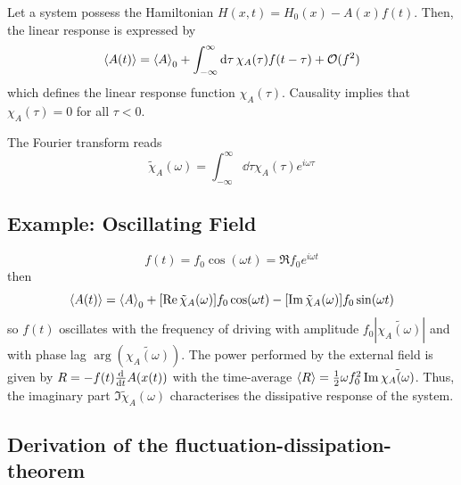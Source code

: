 \documentclass{notebook}
\begin{document}
Let a system possess the Hamiltonian $H(x,t) = H_0(x) - A(x) f(t)$. Then, the linear response is expressed by
%
\begin{equation}
	\expval{A(t)} = \expval{A}_0 + \int_{-\infty}^{\infty} \dd{\tau} \chi_A(\tau) f(t-\tau) + \mathcal{O}(f^2)
\end{equation}
%
which defines the linear response function $\chi_A(\tau)$. Causality implies that $\chi_A(\tau) = 0$ for all $\tau < 0$.

The Fourier transform reads
%
\begin{equation}
\tilde{\chi}_A(\omega) = \int_{-\infty}^{\infty} \dd{\tau} \chi_A(\tau) e^{i \omega \tau}
\end{equation}
%

\subsection*{Example: Oscillating Field}
%
\begin{equation}
	f(t) = f_0 \cos(\omega t) = \Re f_0 e^{i \omega t}
\end{equation}
%
then
%
\begin{equation}
	\expval{A(t)} = \expval{A}_0 + [\Re \tilde{\chi}_A(\omega)] f_0 \cos(\omega t) - [\Im \tilde{\chi}_A(\omega)] f_0 \sin(\omega t)
\end{equation}
%
so $f(t)$ oscillates with the frequency of driving with amplitude $f_0 |\tilde{\chi_A(\omega)}|$ and with phase lag $\arg(\tilde{\chi_A(\omega)})$. The power performed by the external field is given by $R = - f(t) \dv{t} A(x(t))$ with the time-average $\expval{R} = \frac{1}{2} \omega f_0^2 \Im \tilde{\chi_A(\omega)}$. Thus, the imaginary part $\Im \tilde{\chi}_A(\omega)$ characterises the dissipative response of the system.

\subsection*{Derivation of the fluctuation-dissipation-theorem}
\end{document}
